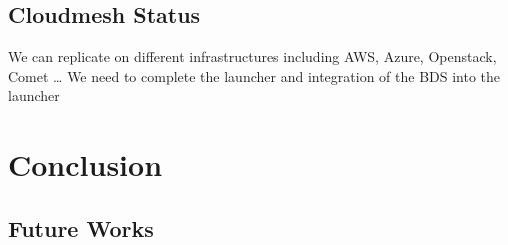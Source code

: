 \subsection{Cloudmesh Status}
We can replicate on different infrastructures including AWS, Azure, Openstack, Comet …
We need to complete the launcher and integration of the BDS into the launcher







\section{Conclusion}


\subsection{Future Works}




